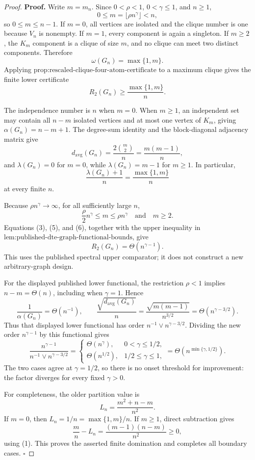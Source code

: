 \documentclass{article}
\begin{document}
\begin{proof}
\textbf{Proof.}
Write \(m=m_n\).  Since \(0<\rho<1\), \(0<\gamma\leq1\), and \(n\geq1\),
\[
0\leq m=\lfloor\rho n^{\gamma}\rfloor<n,
\tag{1}
\]
so \(0\leq m\leq n-1\).  If \(m=0\), all vertices are isolated and the clique number is one because \(V_n\) is nonempty.  If \(m=1\), every component is again a singleton.  If \(m\geq2\), the \(K_m\) component is a clique of size \(m\), and no clique can meet two distinct components.  Therefore
\[
\omega(G_n)=\max\{1,m\}.
\tag{2}
\]
Applying \(\text{prop:rescaled-clique-four-atom-certificate}\) to a maximum clique gives the finite lower certificate
\[
R_2(G_n)\geq\frac{\max\{1,m\}}n.
\tag{3}
\]

The independence number is \(n\) when \(m=0\).  When \(m\geq1\), an independent set may contain all \(n-m\) isolated vertices and at most one vertex of \(K_m\), giving \(\alpha(G_n)=n-m+1\).  The degree-sum identity and the block-diagonal adjacency matrix give
\[
d_{\mathrm{avg}}(G_n)=\frac{2\binom m2}{n}=\frac{m(m-1)}n,
\tag{4}
\]
and \(\lambda(G_n)=0\) for \(m=0\), while \(\lambda(G_n)=m-1\) for \(m\geq1\).  In particular,
\[
\frac{\lambda(G_n)+1}{n}=\frac{\max\{1,m\}}n
\tag{5}
\]
at every finite \(n\).

Because \(\rho n^{\gamma}\to\infty\), for all sufficiently large \(n\),
\[
\frac{\rho}{2}n^{\gamma}\leq m\leq\rho n^{\gamma}
\quad\text{and}\quad m\geq2.
\tag{6}
\]
Equations (3), (5), and (6), together with the upper inequality in \(\text{lem:published-dte-graph-functional-bounds}\), give
\[
R_2(G_n)=\Theta(n^{\gamma-1}).
\tag{7}
\]
This uses the published spectral upper comparator; it does not construct a new arbitrary-graph design.

For the displayed published lower functional, the restriction \(\rho<1\) implies \(n-m=\Theta(n)\), including when \(\gamma=1\).  Hence
\[
\frac1{\alpha(G_n)}=\Theta(n^{-1}),
\qquad
\frac{\sqrt{d_{\mathrm{avg}}(G_n)}}n
=\frac{\sqrt{m(m-1)}}{n^{3/2}}
=\Theta(n^{\gamma-3/2}).
\tag{8}
\]
Thus that displayed lower functional has order \(n^{-1}\vee n^{\gamma-3/2}\).  Dividing the new order \(n^{\gamma-1}\) by this functional gives
\[
\frac{n^{\gamma-1}}{n^{-1}\vee n^{\gamma-3/2}}
=
\begin{cases}
\Theta(n^{\gamma}),&0<\gamma\leq1/2,\\
\Theta(n^{1/2}),&1/2\leq\gamma\leq1,
\end{cases}
=\Theta\!\left(n^{\min\{\gamma,1/2\}}\right).
\tag{9}
\]
The two cases agree at \(\gamma=1/2\), so there is no onset threshold for improvement: the factor diverges for every fixed \(\gamma>0\).

For completeness, the older partition value is
\[
L_n=\frac{m^2+n-m}{n^2}.
\tag{10}
\]
If \(m=0\), then \(L_n=1/n=\max\{1,m\}/n\).  If \(m\geq1\), direct subtraction gives
\[
\frac mn-L_n
=\frac{(m-1)(n-m)}{n^2}\geq0,
\tag{11}
\]
using (1).  This proves the asserted finite domination and completes all boundary cases. \(\square\)
\end{proof}
\end{document}

